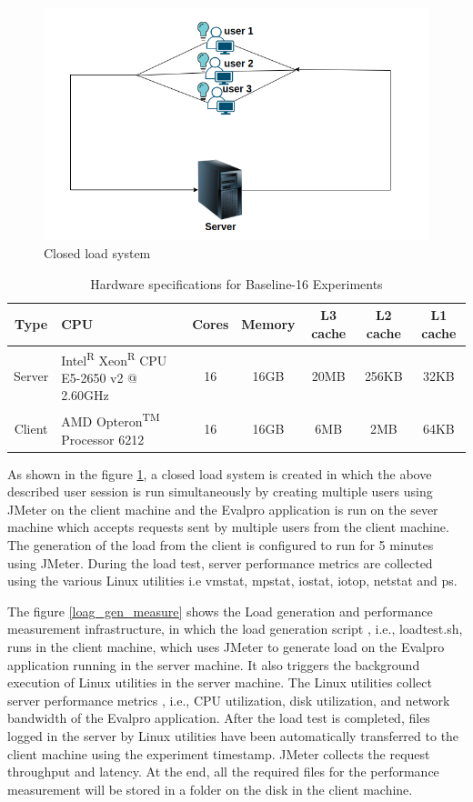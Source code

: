 \documentclass{iitbreport}
\begin{document}
\begin{figure}[!htb]
  \centering
  \includegraphics[width=\linewidth]{Images/closed_loop.png}
  \caption{Closed load system}
  \label{closed_system}
\end{figure}

\begin{table}
  \begin{tabular}{|c|p{9em}|c|c|c|c|c|}
    \hline
    Type&CPU&Cores&Memory&L3 cache&L2 cache&L1 cache\\
    \hline
    Server & Intel\textsuperscript{R} Xeon\textsuperscript{R} CPU E5-2650 v2 @ 2.60GHz& 16&16GB&20MB&256KB&32KB\\
    \hline
    Client & AMD Opteron\textsuperscript{TM} Processor 6212 & 16&16GB&6MB&2MB&64KB\\
  \hline
\end{tabular}
\caption{Hardware specifications for Baseline-16 Experiments}
  \label{tab:hardware}
\end{table}

As shown in the figure  \ref{closed_system}, a closed load system is created in which  the above described user session is run simultaneously by creating multiple users using JMeter  on the client machine and the Evalpro application is run on the sever machine which accepts requests sent by multiple users from the client machine. The generation of the load from the client is configured to run for 5 minutes using JMeter. During the load test, server performance metrics are collected using the various Linux utilities i.e vmstat, mpstat, iostat, iotop, netstat and ps.

The figure \ref{loag_gen_measure} shows the Load generation and performance measurement infrastructure, in which the load generation script , i.e.,  loadtest.sh, runs in the client machine, which uses JMeter to generate  load on the Evalpro application running in the server machine. It also triggers the background execution of Linux utilities in the server machine. The Linux utilities collect server performance metrics , i.e., CPU utilization, disk utilization, and network bandwidth of the Evalpro application. After the load test is completed, files logged in the server by Linux utilities have been automatically transferred to the client machine using the experiment timestamp. JMeter collects the request throughput and latency. At the end, all the required files for the performance measurement will be stored in a folder on the disk in the client machine.
\end{document}
